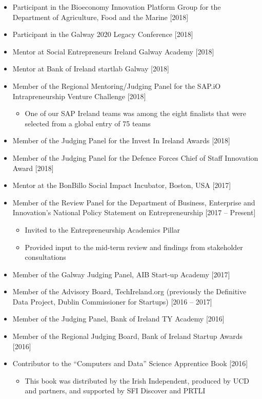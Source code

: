 \documentclass[10pt,a4paper]{res} %
\begin{document}
\begin{resume}
\begin{itemize} \itemsep -2pt
\item Participant in the Bioeconomy Innovation Platform Group for the Department of Agriculture, Food and the Marine [2018]
\item Participant in the Galway 2020 Legacy Conference [2018]
\item Mentor at Social Entrepreneurs Ireland Galway Academy [2018]
\item Mentor at Bank of Ireland startlab Galway [2018]
\item Member of the Regional Mentoring/Judging Panel for the SAP.iO Intrapreneurship Venture Challenge [2018]
\begin{itemize} \itemsep -2pt
\item One of our SAP Ireland teams was among the eight finalists that were selected from a global entry of 75 teams
\end{itemize}
\item Member of the Judging Panel for the Invest In Ireland Awards [2018]
\item Member of the Judging Panel for the Defence Forces Chief of Staff Innovation Award [2018]
\item Mentor at the BonBillo Social Impact Incubator, Boston, USA [2017]
\item Member of the Review Panel for the Department of Business, Enterprise and Innovation's National Policy Statement on Entrepreneurship [2017 -- Present]
\begin{itemize} \itemsep -2pt
\item Invited to the Entrepreneurship Academics Pillar
\item Provided input to the mid-term review and findings from stakeholder consultations
\end{itemize}
\item Member of the Galway Judging Panel, AIB Start-up Academy [2017]
\item Member of the Advisory Board, TechIreland.org (previously the Definitive Data Project, Dublin Commissioner for Startups) [2016 -- 2017]
\item Member of the Judging Panel, Bank of Ireland TY Academy [2016]
\item Member of the Regional Judging Board, Bank of Ireland Startup Awards [2016]
\item Contributor to the ``Computers and Data'' Science Apprentice Book [2016]
\begin{itemize} \itemsep -2pt
\item This book was distributed by the Irish Independent, produced by UCD and partners, and supported by SFI Discover and PRTLI

\end{itemize}
\end{itemize}
\end{resume}
\end{document}
